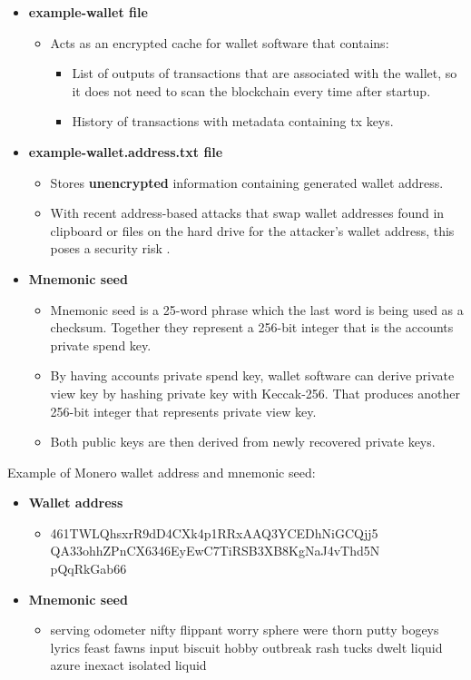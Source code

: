 \documentclass[
  printed, %
  table,   %
  lof,     %
  lot,     %
           oneside, color
]{fithesis3}
\renewcommand{\texttt}[1]{%
  \begingroup
  \ttfamily
  \begingroup\lccode`~=`/\lowercase{\endgroup\def~}{/\discretionary{}{}{}}%
  \begingroup\lccode`~=`[\lowercase{\endgroup\def~}{[\discretionary{}{}{}}%
  \begingroup\lccode`~=`.\lowercase{\endgroup\def~}{.\discretionary{}{}{}}%
  \catcode`/=\active\catcode`[=\active\catcode`.=\active
  \scantokens{#1\noexpand}%
  \endgroup
}
\begin{document}
\begin{itemize}
\item \textbf{example-wallet file}
\begin{itemize}\itemsep0em
\item Acts as an encrypted cache for wallet software that contains:
\begin{itemize}\itemsep0em
\item List of outputs of transactions that are associated with the wallet, so it does not need to scan the blockchain every time after startup.
\item History of transactions with metadata containing tx keys.
\end{itemize}
\end{itemize}
\item \textbf{example-wallet.address.txt file}
\begin{itemize}\itemsep0em
\item Stores \textbf{unencrypted} information containing generated wallet address.
\item With recent address-based attacks that swap wallet addresses found in clipboard or files on the hard drive for the attacker's wallet address, this poses a security risk \cite{cryptoshuffler}.
\end{itemize}
\item \textbf{Mnemonic seed}
\begin{itemize}\itemsep0em
\item Mnemonic seed is a 25-word phrase which the last word is being used as a checksum. Together they represent a 256-bit integer that is the accounts private spend key.
\item By having accounts private spend key, wallet software can derive private view key by hashing private key with Keccak-256. That produces another 256-bit integer that represents private view key.
\item Both public keys are then derived from newly recovered private keys.
\end{itemize}
\end{itemize}
Example of Monero wallet address and mnemonic seed:
\begin{itemize}\itemsep0em
\item \textbf{Wallet address}
\begin{itemize}\itemsep0em
\item 461TWLQhsxrR9dD4CXk4p1RRxAAQ3YCEDhNiGCQjj5\\QA33ohhZPnCX6346EyEwC7TiRSB3XB8KgNaJ4vThd5N\\pQqRkGab66
\end{itemize}
\item \textbf{Mnemonic seed}
\begin{itemize}\itemsep0em
\item serving odometer nifty flippant worry sphere were thorn putty bogeys lyrics feast fawns input biscuit hobby outbreak rash tucks dwelt liquid azure inexact isolated liquid
\end{itemize}
\end{itemize}
\end{document}
